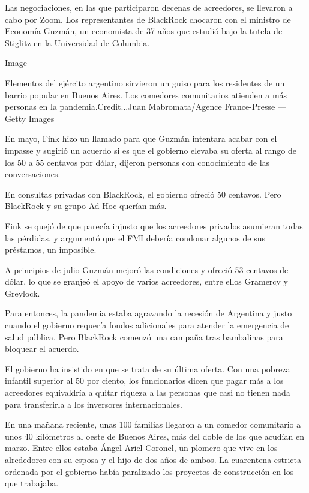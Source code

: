 Las negociaciones, en las que participaron decenas de acreedores, se
llevaron a cabo por Zoom. Los representantes de BlackRock chocaron con
el ministro de Economía Guzmán, un economista de 37 años que estudió
bajo la tutela de Stiglitz en la Universidad de Columbia.

Image

Elementos del ejército argentino sirvieron un guiso para los residentes
de un barrio popular en Buenos Aires. Los comedores comunitarios
atienden a más personas en la pandemia.Credit...Juan Mabromata/Agence
France-Presse --- Getty Images

En mayo, Fink hizo un llamado para que Guzmán intentara acabar con el
impasse y sugirió un acuerdo si es que el gobierno elevaba su oferta al
rango de los 50 a 55 centavos por dólar, dijeron personas con
conocimiento de las conversaciones.

En consultas privadas con BlackRock, el gobierno ofreció 50 centavos.
Pero BlackRock y su grupo Ad Hoc querían más.

Fink se quejó de que parecía injusto que los acreedores privados
asumieran todas las pérdidas, y argumentó que el FMI debería condonar
algunos de sus préstamos, un imposible.

A principios de julio
\href{https://ara.reuters.com/article/businessNews/idARL1N2ED0XB}{Guzmán
mejoró las condiciones} y ofreció 53 centavos de dólar, lo que se
granjeó el apoyo de varios acreedores, entre ellos Gramercy y Greylock.

Para entonces, la pandemia estaba agravando la recesión de Argentina y
justo cuando el gobierno requería fondos adicionales para atender la
emergencia de salud pública. Pero BlackRock comenzó una campaña tras
bambalinas para bloquear el acuerdo.

El gobierno ha insistido en que se trata de su última oferta. Con una
pobreza infantil superior al 50 por ciento, los funcionarios dicen que
pagar más a los acreedores equivaldría a quitar riqueza a las personas
que casi no tienen nada para transferirla a los inversores
internacionales.

En una mañana reciente, unas 100 familias llegaron a un comedor
comunitario a unos 40 kilómetros al oeste de Buenos Aires, más del doble
de los que acudían en marzo. Entre ellos estaba Ángel Ariel Coronel, un
plomero que vive en los alrededores con su esposa y el hijo de dos años
de ambos. La cuarentena estricta ordenada por el gobierno había
paralizado los proyectos de construcción en los que trabajaba.

